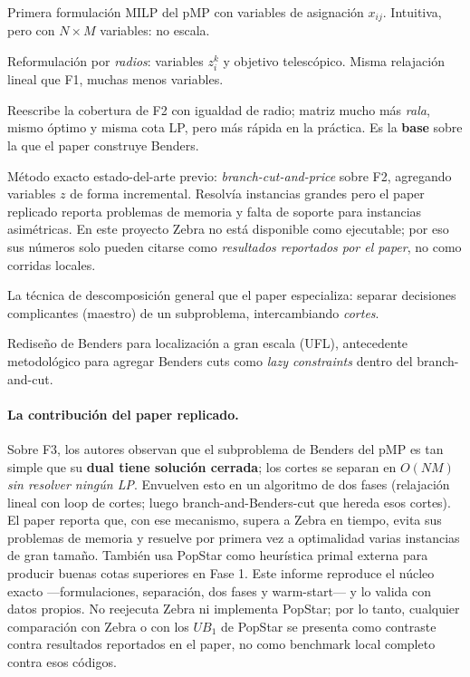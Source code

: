 \begin{description}[leftmargin=1.6em]
  \item[ReVelle \& Swain (1970) — F1.] Primera formulación MILP del pMP con variables de
        asignación $x_{ij}$. Intuitiva, pero con $N\times M$ variables: no escala.
  \item[Cornuejols, Nemhauser \& Wolsey (1980) — F2.] Reformulación por \emph{radios}: variables
        $z^k_i$ y objetivo telescópico. Misma relajación lineal que F1, muchas menos variables.
  \item[Elloumi (2010) — F3.] Reescribe la cobertura de F2 con igualdad de radio; matriz mucho
        más \emph{rala}, mismo óptimo y misma cota LP, pero más rápida en la práctica. Es la
        \textbf{base} sobre la que el paper construye Benders.
  \item[García, Labbé \& Marín (2011) — Zebra.] Método exacto estado-del-arte previo:
        \emph{branch-cut-and-price} sobre F2, agregando variables $z$ de forma incremental.
        Resolvía instancias grandes pero el paper replicado reporta problemas de memoria y falta
        de soporte para instancias asimétricas. En este proyecto Zebra no está disponible como
        ejecutable; por eso sus números solo pueden citarse como \emph{resultados reportados por
        el paper}, no como corridas locales.
  \item[Benders (1962).] La técnica de descomposición general que el paper especializa: separar
        decisiones complicantes (maestro) de un subproblema, intercambiando \emph{cortes}.
  \item[Fischetti, Ljubić \& Sinnl (2017).] Rediseño de Benders para localización a gran escala
        (UFL), antecedente metodológico para agregar Benders cuts como \textit{lazy constraints}
        dentro del branch-and-cut.
\end{description}

\paragraph{La contribución del paper replicado.} Sobre F3, los autores observan que el
subproblema de Benders del pMP es tan simple que su \textbf{dual tiene solución cerrada}; los
cortes se separan en $O(NM)$ \emph{sin resolver ningún LP}. Envuelven esto en un algoritmo de
dos fases (relajación lineal con loop de cortes; luego branch-and-Benders-cut que hereda esos
cortes). El paper reporta que, con ese mecanismo, supera a Zebra en tiempo, evita sus problemas
de memoria y resuelve por primera vez a optimalidad varias instancias de gran tamaño. También usa
PopStar como heurística primal externa para producir buenas cotas superiores en Fase 1. Este
informe reproduce el núcleo exacto —formulaciones, separación, dos fases y warm-start— y lo
valida con datos propios. No reejecuta Zebra ni implementa PopStar; por lo tanto, cualquier
comparación con Zebra o con los $UB_1$ de PopStar se presenta como contraste contra resultados
reportados en el paper, no como benchmark local completo contra esos códigos.

